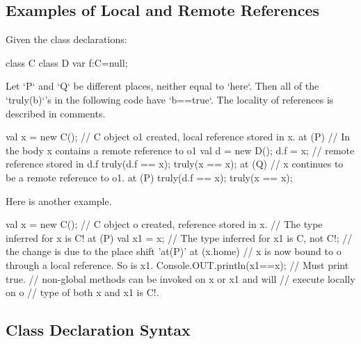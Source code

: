   

  
\subsection{Examples of Local and Remote References}
Given the class declarations: 
\begin{xten}
class C { } 
class D {
   var f:C=null;
}
\end{xten}

Let \xcd`P` and \xcd`Q` be different places, neither equal to \xcd`here`.
Then all of the \xcd`truly(b)`'s in the following code have \xcd`b==true`.
The locality of references is described in comments.
\begin{xten}

val x = new C(); 
// C object o1 created, local reference stored in x. 
at (P) { 
      // In the body x contains a remote reference to o1
      val d = new D();
      d.f  = x; // remote reference stored in d.f
      truly(d.f == x);        
      truly(x == x);          
      at (Q) { 
         // x continues to be a remote reference to o1.
         at (P) {  
             truly(d.f == x); 
             truly(x == x);   
         }
      }
}
\end{xten}
  
Here is another example.
\begin{xten}
val x = new C(); 
// C object o created, reference stored in x. 
// The type inferred for x is C!
at (P) { 
    val x1 = x; 
    // The type inferred for x1 is C, not C!;
    // the change is due to the place shift 'at(P)'
  at (x.home) {
        // x is now bound to o through a local reference. So is x1.
    Console.OUT.println(x1==x); // Must print true.
      // non-global methods can be invoked on x or x1 and will 
      // execute locally on o
      // type of both x and x1 is C!.
  }
}
\end{xten}
 
\subsection{Class Declaration Syntax}

